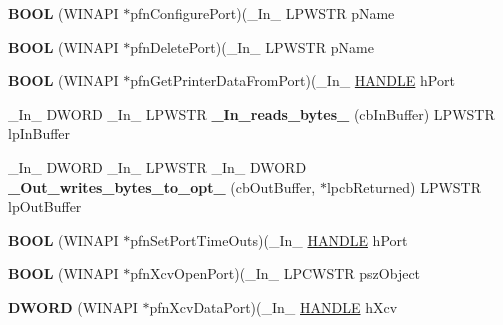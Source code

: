 \begin{DoxyCompactItemize}
\mbox{\label{struct___m_o_n_i_t_o_r_aecf0d4ed176e1279c737e16a8cbe5544}} 
{\bfseries B\+O\+OL} (W\+I\+N\+A\+PI $\ast$pfn\+Configure\+Port)(\+\_\+\+In\+\_\+ L\+P\+W\+S\+TR p\+Name
\item 
\mbox{\label{struct___m_o_n_i_t_o_r_a8c1305041e0822e412d4ccf8597ccb0c}} 
{\bfseries B\+O\+OL} (W\+I\+N\+A\+PI $\ast$pfn\+Delete\+Port)(\+\_\+\+In\+\_\+ L\+P\+W\+S\+TR p\+Name
\item 
\mbox{\label{struct___m_o_n_i_t_o_r_af4abf5994ec5d673bbcf0a814b2518b9}} 
{\bfseries B\+O\+OL} (W\+I\+N\+A\+PI $\ast$pfn\+Get\+Printer\+Data\+From\+Port)(\+\_\+\+In\+\_\+ \hyperlink{interfacevoid}{H\+A\+N\+D\+LE} h\+Port
\item 
\mbox{\label{struct___m_o_n_i_t_o_r_a8c05c39ddbe5cf12a9278ddddd2081ae}} 
\+\_\+\+In\+\_\+ D\+W\+O\+RD \+\_\+\+In\+\_\+ L\+P\+W\+S\+TR {\bfseries \+\_\+\+In\+\_\+reads\+\_\+bytes\+\_\+} (cb\+In\+Buffer) L\+P\+W\+S\+TR lp\+In\+Buffer
\item 
\mbox{\label{struct___m_o_n_i_t_o_r_a445cded9cde5ccf1e6950af90713dd15}} 
\+\_\+\+In\+\_\+ D\+W\+O\+RD \+\_\+\+In\+\_\+ L\+P\+W\+S\+TR \+\_\+\+In\+\_\+ D\+W\+O\+RD {\bfseries \+\_\+\+Out\+\_\+writes\+\_\+bytes\+\_\+to\+\_\+opt\+\_\+} (cb\+Out\+Buffer, $\ast$lpcb\+Returned) L\+P\+W\+S\+TR lp\+Out\+Buffer
\item 
\mbox{\label{struct___m_o_n_i_t_o_r_a5a136a764e894f6d77733b5b811d1df5}} 
{\bfseries B\+O\+OL} (W\+I\+N\+A\+PI $\ast$pfn\+Set\+Port\+Time\+Outs)(\+\_\+\+In\+\_\+ \hyperlink{interfacevoid}{H\+A\+N\+D\+LE} h\+Port
\item 
\mbox{\label{struct___m_o_n_i_t_o_r_aa4c3be04c51102978ec717e6019994f4}} 
{\bfseries B\+O\+OL} (W\+I\+N\+A\+PI $\ast$pfn\+Xcv\+Open\+Port)(\+\_\+\+In\+\_\+ L\+P\+C\+W\+S\+TR psz\+Object
\item 
\mbox{\label{struct___m_o_n_i_t_o_r_a13c928838a514350f19f3c194d297098}} 
{\bfseries D\+W\+O\+RD} (W\+I\+N\+A\+PI $\ast$pfn\+Xcv\+Data\+Port)(\+\_\+\+In\+\_\+ \hyperlink{interfacevoid}{H\+A\+N\+D\+LE} h\+Xcv

\end{DoxyCompactItemize}
